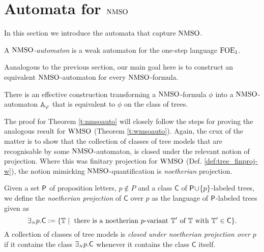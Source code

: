 
\section{Automata for $\mathrm{NMSO}$}
   \label{sec:autnmso}

In this section we introduce the automata that capture $\mathrm{NMSO}$.

\begin{definition}
A \emph{$\mathrm{NMSO}$-automaton} is a weak automaton for the one-step language $\mathrm{FOE}_1$.
\end{definition}

Aanalogous to the previous section, our main goal here is to construct an
equivalent $\mathrm{NMSO}$-automaton for every $\mathrm{NMSO}$-formula.

\begin{theorem}
\label{t:nmsoauto}
There is an effective construction transforming a $\mathrm{NMSO}$-formula $\phi$
into a $\mathrm{NMSO}$-automaton $\mathbb{A}_{\varphi}$ that is equivalent
to $\phi$ on the class of trees.
\end{theorem}

The proof for Theorem \ref{t:nmsoauto} will closely follow the steps for proving
the analogous result for $\mathrm{WMSO}$ (Theorem \ref{t:wmsoauto}).
Again, the crux of the matter is to show that the collection of classes of tree
models that are recognisable by some $\mathrm{NMSO}$-automaton, is closed under the 
relevant notion of projection.
Where this was finitary projection for $\mathrm{WMSO}$ (Def. \ref{def:tree_finproj-w}),
the notion mimicking $\mathrm{NMSO}$-quantification is \emph{noetherian} projection.

\begin{definition}\label{def:tree_finproj-n}
Given a set $\mathsf{P}$ of proposition letters, $p \not\in P$ and a class 
$\mathsf{C}$ of $\mathsf{P}\!\cup\!\{p\}$-labeled trees, we define the \emph{noetherian 
projection} of $\mathsf{C}$ over $p$ as the language of $\mathsf{P}$-labeled trees 
given as 
$$
\noetexists p.\mathsf{C} \df \{\bbT \mid 
   \text{ there is a noetherian $p$-variant } \bbT' \text{ of } \bbT 
   \text{ with } \bbT' \in \mathsf{C}\}.
$$
A collection of classes of tree models is \emph{closed under noetherian 
projection over $p$} if it contains the class ${{\exists_{{\scriptscriptstyle N}}} p}.\mathsf{C}$
whenever it contains the class $\mathsf{C}$ itself.
\end{definition}


